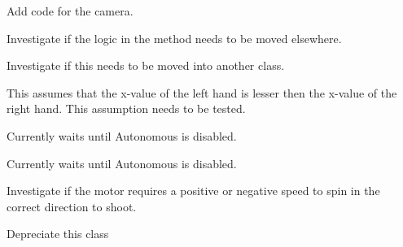
\begin{DoxyRefList}
\item[\label{todo__todo000007}%
\hypertarget{todo__todo000007}{}%
\-Member \hyperlink{class_automatic_shooter_controller_ab5a52a59dcb9957de5a20d5ddd9f5303}{\-Automatic\-Shooter\-Controller\-:\-:\-Calculate\-Distance} ()]\-Add code for the camera.

\-Investigate if the logic in the method needs to be moved elsewhere.  
\item[\label{todo__todo000006}%
\hypertarget{todo__todo000006}{}%
\-Member \hyperlink{class_automatic_shooter_controller_ade48e6198578a2f8234fb9cac9b9dc31}{\-Automatic\-Shooter\-Controller\-:\-:\-Set\-Speed\-Automatically} ()]\-Investigate if this needs to be moved into another class.  
\item[\label{todo__todo000004}%
\hypertarget{todo__todo000004}{}%
\-Member \hyperlink{class_base_kinect_controller_ad6e79c8e4afab9ba5451079890e31f39}{\-Base\-Kinect\-Controller\-:\-:\-Is\-Player\-Ready} (void)]\-This assumes that the x-\/value of the left hand is lesser then the x-\/value of the right hand. \-This assumption needs to be tested. 
\item[\label{todo__todo000001}%
\hypertarget{todo__todo000001}{}%
\-Member \hyperlink{class_main_robot_a717c79b7473721ed0c1b2e994658b4aa}{\-Main\-Robot\-:\-:\-Autonomous} ()]\-Currently waits until \-Autonomous is disabled.  
\item[\label{todo__todo000002}%
\hypertarget{todo__todo000002}{}%
\-Member \hyperlink{class_prototype_robot_aa9435e95526e228db834f6cbec379d5d}{\-Prototype\-Robot\-:\-:\-Autonomous} ()]\-Currently waits until \-Autonomous is disabled.  
\item[\label{todo__todo000005}%
\hypertarget{todo__todo000005}{}%
\-Member \hyperlink{class_shooter_a05fdd64fa0a3eaca039a36269c47fe7c}{\-Shooter\-:\-:\-Set\-Speed} (float)]\-Investigate if the motor requires a positive or negative speed to spin in the correct direction to shoot. 
\item[\label{todo__todo000003}%
\hypertarget{todo__todo000003}{}%
\-Class \hyperlink{class_simple_arm}{\-Simple\-Arm} ]\-Depreciate this class 
\end{DoxyRefList}